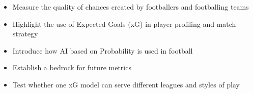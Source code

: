 \begin{itemize}
    \item Measure the quality of chances created by footballers and footballing teams
    \item Highlight the use of Expected Goals (xG) in player profiling and match strategy
    \item Introduce how AI based on Probability is used in football 
    \item Establish a bedrock for future metrics 
    \item Test whether one xG model can serve different leagues and styles of play
\end{itemize}


